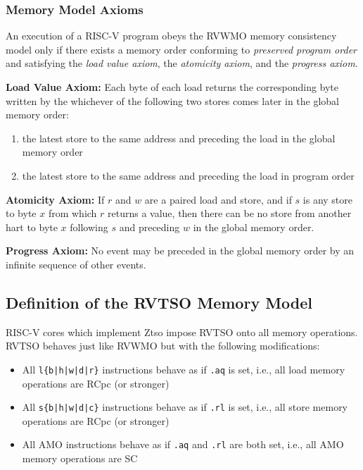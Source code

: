 \subsubsection*{Memory Model Axioms}

An execution of a RISC-V program obeys the RVWMO memory consistency model only if there exists a memory order conforming to {\em preserved program order} and satisfying the {\em load value axiom}, the {\em atomicity axiom}, and the {\em progress axiom}.

\newcommand{\loadvalueaxiom}{
  Each byte of each load returns the corresponding byte written by the whichever of the following two stores comes later in the global memory order:
  \begin{enumerate}
    \item the latest store to the same address and preceding the load in the global memory order
    \item the latest store to the same address and preceding the load in program order
  \end{enumerate}
}

\newcommand{\atomicityaxiom}{If $r$ and $w$ are a paired load and store, and if $s$ is any store to byte $x$ from which $r$ returns a value, then there can be no store from another hart to byte $x$ following $s$ and preceding $w$ in the global memory order.}

\newcommand{\progressaxiom}{No event may be preceded in the global memory order by an infinite sequence of other events.}

\textbf{Load Value Axiom:} \loadvalueaxiom

\textbf{Atomicity Axiom:} \atomicityaxiom

\textbf{Progress Axiom:} \progressaxiom

\subsection{Definition of the RVTSO Memory Model}
\label{sec:tso}

RISC-V cores which implement Ztso impose RVTSO onto all memory operations.
RVTSO behaves just like RVWMO but with the following modifications:

\begin{itemize}
  \item All {\tt l\{b|h|w|d|r\}} instructions behave as if {\tt .aq} is set, i.e., all load memory operations are RCpc (or stronger)
  \item All {\tt s\{b|h|w|d|c\}} instructions behave as if {\tt .rl} is set, i.e., all store memory operations are RCpc (or stronger)
  \item All AMO instructions behave as if {\tt .aq} and {\tt .rl} are both set, i.e., all AMO memory operations are SC
\end{itemize}

